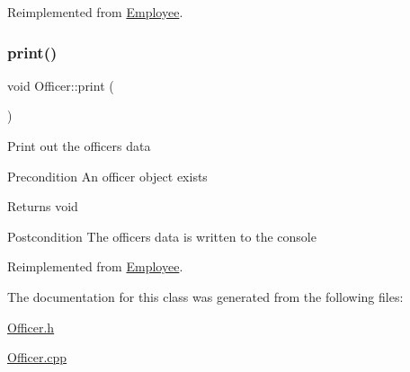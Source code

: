 Reimplemented from \hyperlink{classEmployee_a01c2c44e15434237db28832f6972e960}{Employee}.

\mbox{\label{classOfficer_aeadece05a1a0b7fb29bd412830d2e07a}} 
\subsubsection{\texorpdfstring{print()}{print()}}
{\footnotesize\ttfamily void Officer\+::print (\begin{DoxyParamCaption}{ }\end{DoxyParamCaption})\hspace{0.3cm}{\ttfamily [virtual]}}

Print out the officer\textquotesingle{}s data

\begin{DoxyPrecond}{Precondition}
An officer object exists 
\end{DoxyPrecond}
\begin{DoxyReturn}{Returns}
void 
\end{DoxyReturn}
\begin{DoxyPostcond}{Postcondition}
The officer\textquotesingle{}s data is written to the console 
\end{DoxyPostcond}


Reimplemented from \hyperlink{classEmployee_a79556ad700627dba88049f487a34a762}{Employee}.



The documentation for this class was generated from the following files\+:\begin{DoxyCompactItemize}
\item 
\hyperlink{Officer_8h}{Officer.\+h}\item 
\hyperlink{Officer_8cpp}{Officer.\+cpp}\end{DoxyCompactItemize}
